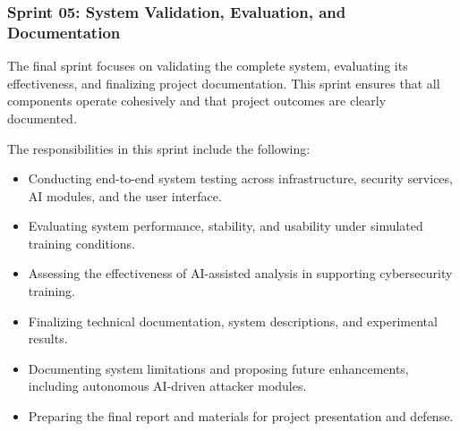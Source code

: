 \subsubsection{Sprint 05: System Validation, Evaluation, and Documentation}
The final sprint focuses on validating the complete system, evaluating its effectiveness, and finalizing project documentation. This sprint ensures that all components operate cohesively and that project outcomes are clearly documented.

The responsibilities in this sprint include the following:
\begin{itemize}
	\item Conducting end-to-end system testing across infrastructure, security services, AI modules, and the user interface.
	\item Evaluating system performance, stability, and usability under simulated training conditions.
	\item Assessing the effectiveness of AI-assisted analysis in supporting cybersecurity training.
	\item Finalizing technical documentation, system descriptions, and experimental results.
	\item Documenting system limitations and proposing future enhancements, including autonomous AI-driven attacker modules.
	\item Preparing the final report and materials for project presentation and defense.
\end{itemize}

